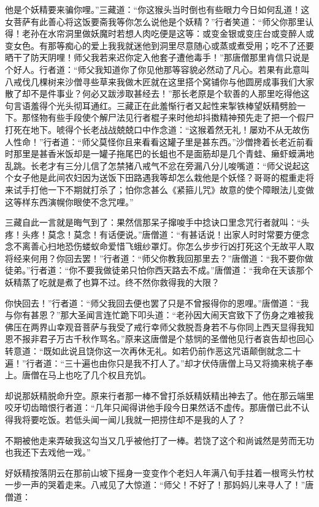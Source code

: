 \documentclass[12pt,UTF8]{ctexbook}
\begin{document}
他是个妖精要来骗你哩。”三藏道：“你这猴头当时倒也有些眼力今日如何乱道！这女菩萨有此善心将这饭要斋我等你怎么说他是个妖精？”行者笑道：“师父你那里认得！老孙在水帘洞里做妖魔时若想人肉吃便是这等：或变金银或变庄台或变醉人或变女色。有那等痴心的爱上我我就迷他到洞里尽意随心或蒸或煮受用；吃不了还要晒干了防天阴哩！师父我若来迟你定入他套子遭他毒手！”那唐僧那里肯信只说是个好人。行者道：“师父我知道你了你见他那等容貌必然动了凡心。若果有此意叫八戒伐几棵树来沙僧寻些草来我做木匠就在这里搭个窝铺你与他圆房成事我们大家散了却不是件事业？何必又跋涉取甚经去！”那长老原是个软善的人那里吃得他这句言语羞得个光头彻耳通红。三藏正在此羞惭行者又起性来掣铁棒望妖精劈脸一下。那怪物有些手段使个解尸法见行者棍子来时他却抖擞精神预先走了把一个假尸打死在地下。唬得个长老战战兢兢口中作念道：“这猴着然无礼！屡劝不从无故伤人性命！”行者道：“师父莫怪你且来看看这罐子里是甚东西。”沙僧搀着长老近前看时那里是甚香米饭却是一罐子拖尾巴的长蛆也不是面筋却是几个青蛙、癞虾蟆满地乱跳。长老才有三分儿信了怎禁猪八戒气不忿在旁漏八分儿唆嘴道：“师父说起这个女子他是此间农妇因为送饭下田路遇我等却怎么栽他是个妖怪？哥哥的棍重走将来试手打他一下不期就打杀了；怕你念甚么《紧箍儿咒》故意的使个障眼法儿变做这等样东西演幌你眼使不念咒哩。”

三藏自此一言就是晦气到了：果然信那呆子撺唆手中捻诀口里念咒行者就叫：“头疼！头疼！莫念！莫念！有话便说。”唐僧道：“有甚话说！出家人时时常要方便念念不离善心扫地恐伤蝼蚁命爱惜飞蛾纱罩灯。你怎么步步行凶打死这个无故平人取将经来何用？你回去罢！”行者道：“师父你教我回那里去？”唐僧道：“我不要你做徒弟。”行者道：“你不要我做徒弟只怕你西天路去不成。”唐僧道：“我命在天该那个妖精蒸了吃就是煮了也算不过。终不然你救得我的大限？

你快回去！”行者道：“师父我回去便也罢了只是不曾报得你的恩哩。”唐僧道：“我与你有甚恩？”那大圣闻言连忙跪下叩头道：“老孙因大闹天宫致下了伤身之难被我佛压在两界山幸观音菩萨与我受了戒行幸师父救脱吾身若不与你同上西天显得我知恩不报非君子万古千秋作骂名。”原来这唐僧是个慈悯的圣僧他见行者哀告却也回心转意道：“既如此说且饶你这一次再休无礼。如若仍前作恶这咒语颠倒就念二十遍！”行者道：“三十遍也由你只是我不打人了。”却才伏侍唐僧上马又将摘来桃子奉上。唐僧在马上也吃了几个权且充饥。

却说那妖精脱命升空。原来行者那一棒不曾打杀妖精妖精出神去了。他在那云端里咬牙切齿暗恨行者道：“几年只闻得讲他手段今日果然话不虚传。那唐僧已此不认得我将要吃饭。若低头闻一闻儿我就一把捞住却不是我的人了？

不期被他走来弄破我这勾当又几乎被他打了一棒。若饶了这个和尚诚然是劳而无功也我还下去戏他一戏。”

好妖精按落阴云在那前山坡下摇身一变变作个老妇人年满八旬手拄着一根弯头竹杖一步一声的哭着走来。八戒见了大惊道：“师父！不好了！那妈妈儿来寻人了！”唐僧道：
\end{document}
